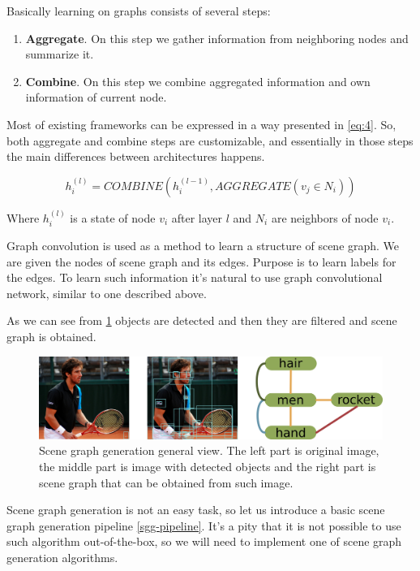 Basically learning on graphs consists of several steps:

\begin{enumerate}
    \item \textbf{Aggregate}. On this step we gather information from neighboring nodes and summarize it.
    \item \textbf{Combine}. On this step we combine aggregated information and own information of current node.
\end{enumerate}

Most of existing frameworks can be expressed in a way presented in \ref{eq:4}. So, both aggregate and combine steps are customizable, and essentially in those steps the main differences between architectures happens.

\begin{equation}
    \label{eq:4}
    h_i^{(l)}=COMBINE(h_i^{(l-1)}, AGGREGATE(v_j\in N_i))
\end{equation}

Where $h_i^{(l)}$ is a state of node $v_i$ after layer $l$ and $N_i$ are neighbors of node $v_i$.

Graph convolution is used as a method to learn a structure of scene graph. We are given the nodes of scene graph and its edges. Purpose is to learn labels for the edges. To learn such information it's natural to use graph convolutional network, similar to one described above.

As we can see from \ref{scene-graph-example} objects are detected and then they are filtered and scene graph is obtained.

\begin{figure}[!h]
    \centering
    \includegraphics[width=\textwidth]{figure/scene-graph-example.png}
    \caption{Scene graph generation general view. The left part is original image, the middle part is image with detected objects and the right part is scene graph that can be obtained from such image.}
    \label{scene-graph-example}
\end{figure}

Scene graph generation is not an easy task, so let us introduce a basic scene graph generation pipeline \ref{sgg-pipeline}. It's a pity that it is not possible to use such algorithm out-of-the-box, so we will need to implement one of scene graph generation algorithms.

